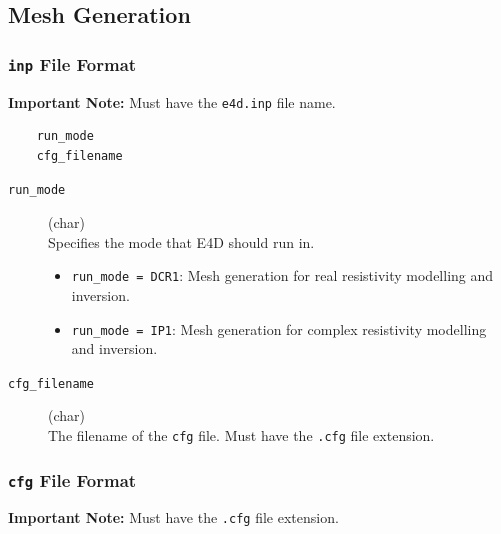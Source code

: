 \documentclass[a4paper,12pt]{article}
\begin{document}
\newpage
\subsection{Mesh Generation}

\subsubsection{\texttt{inp} File Format} \label{mesh_inp}



\begin{framed}
\noindent \textbf{Important Note:} Must have the \texttt{e4d.inp} file name.
\end{framed}

\begin{framed}
\begin{verbatim}
    run_mode
    cfg_filename
\end{verbatim}
\end{framed}

\begin{description}
    \item[\texttt{run\_mode}] (char)\hfill \\
    Specifies the mode that E4D should run in.
    \begin{itemize}
        \item \texttt{run\_mode = DCR1}: Mesh generation for real resistivity modelling and inversion.
        \item \texttt{run\_mode = IP1}: Mesh generation for complex resistivity modelling and inversion.
    \end{itemize}
    
    \item[\texttt{cfg\_filename}] (char)\hfill \\
    The filename of the \texttt{cfg} file. Must have the \texttt{.cfg} file extension.
\end{description}


\newpage
\subsubsection{\texttt{cfg} File Format} \label{mesh_cfg}


\begin{framed}
\noindent \textbf{Important Note:} Must have the \texttt{.cfg} file extension.
\end{framed}
\end{document}
